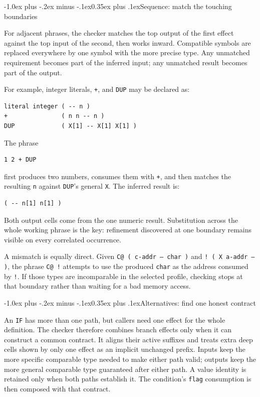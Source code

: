 \documentclass[a4paper,10pt]{article}
\makeatletter
\renewcommand\subsection{\@startsection{subsection}{2}{\z@}%
  {-1.0ex plus -.2ex minus -.1ex}{0.35ex plus .1ex}{\normalsize\bfseries}}
\makeatother
\begin{document}
\subsection{Sequence: match the touching boundaries}

For adjacent phrases, the checker matches the top output of the first effect
against the top input of the second, then works inward.  Compatible symbols
are replaced everywhere by one symbol with the more precise type.  Any
unmatched requirement becomes part of the inferred input; any unmatched result
becomes part of the output.

For example, integer literals, \texttt{+}, and \texttt{DUP} may be declared as:
\begin{lstlisting}
literal integer ( -- n )
+               ( n n -- n )
DUP             ( X[1] -- X[1] X[1] )
\end{lstlisting}
The phrase
\begin{lstlisting}
1 2 + DUP
\end{lstlisting}
first produces two numbers, consumes them with \texttt{+}, and then matches the
resulting \texttt{n} against \texttt{DUP}'s general \texttt{X}.  The inferred
result is:
\begin{lstlisting}
( -- n[1] n[1] )
\end{lstlisting}
Both output cells come from the one numeric result.  Substitution across the
whole working phrase is the key: refinement discovered at one boundary remains
visible on every correlated occurrence.

A mismatch is equally direct.  Given \texttt{C@ ( c-addr -- char )} and
\texttt{! ( X a-addr -- )}, the phrase \texttt{C@ !} attempts to use the
produced \texttt{char} as the address consumed by \texttt{!}.  If those types
are incomparable in the selected profile, checking stops at that boundary
rather than waiting for a bad memory access.

\subsection{Alternatives: find one honest contract}

An \texttt{IF} has more than one path, but callers need one effect for the
whole definition.  The checker therefore combines branch effects only when it
can construct a common contract.  It aligns their active suffixes and treats
extra deep cells shown by only one effect as an implicit unchanged prefix.
Inputs keep the more specific comparable type needed to make either path
valid; outputs keep the more general comparable type guaranteed after either
path.  A value identity is retained only when both paths establish it.  The
condition's \texttt{flag} consumption is then composed with that contract.
\end{document}
